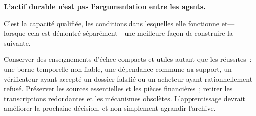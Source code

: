 \documentclass[11pt,a4paper]{article}
\begin{document}
\begin{insight}
\textbf{L’actif durable n’est pas l’argumentation entre les agents.}\par
C’est la capacité qualifiée, les conditions dans lesquelles elle fonctionne et---lorsque cela est démontré séparément---une meilleure façon de construire la suivante.
\end{insight}

Conserver des enseignements d’échec compacts et utiles autant que les réussites~: une borne temporelle non fiable, une dépendance commune au support, un vérificateur ayant accepté un dossier falsifié ou un acheteur ayant rationnellement refusé. Préserver les sources essentielles et les pièces financières~; retirer les transcriptions redondantes et les mécanismes obsolètes. L’apprentissage devrait améliorer la prochaine décision, et non simplement agrandir l’archive.
\end{document}
